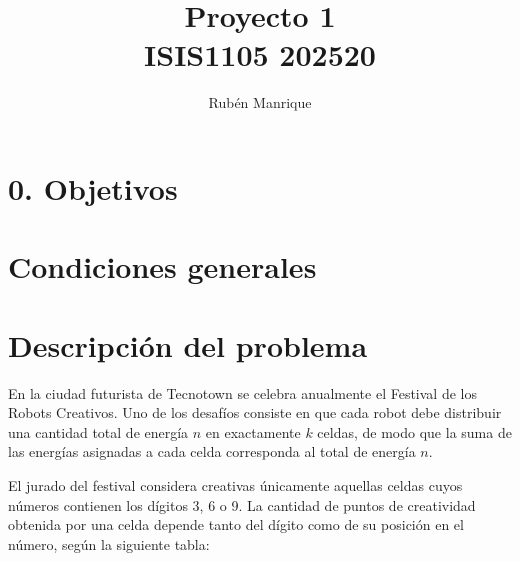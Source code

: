 \documentclass{amsart}
\title{Proyecto 1 \\ ISIS1105 202520}
\author{Rubén Manrique}
\begin{document}
\maketitle

\section*{0. Objetivos}

\section{Condiciones generales}

\section{Descripción del problema}	
En la ciudad futurista de Tecnotown se celebra anualmente el Festival de los
Robots Creativos. Uno de los desafíos consiste en que cada robot debe distribuir
una cantidad total de energía $n$ en exactamente $k$ celdas, de modo que la suma de
las energías asignadas a cada celda corresponda al total de energía $n$.

\bigskip
El jurado del festival considera creativas únicamente aquellas celdas cuyos números
contienen los dígitos 3, 6 o 9. La cantidad de puntos de creatividad obtenida por
una celda depende tanto del dígito como de su posición en el número, según la
siguiente tabla:
\end{document}
